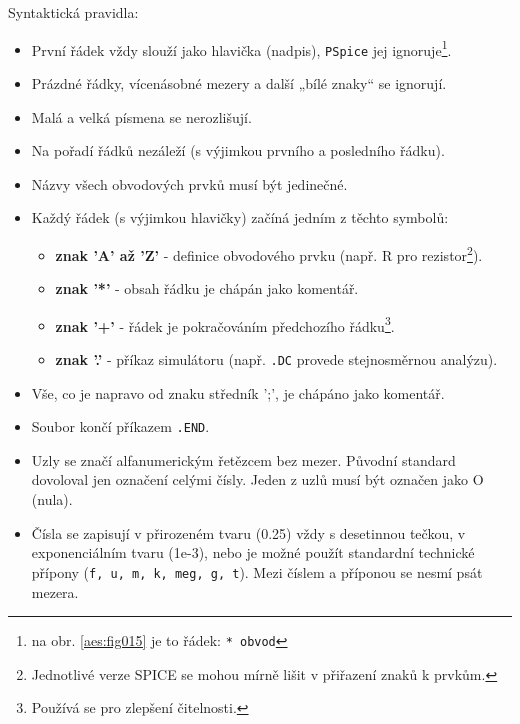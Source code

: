       \begin{tcnote}
        Syntaktická pravidla:
        \begin{itemize}[noitemsep]
          \item První řádek vždy slouží jako hlavička (nadpis), \texttt{PSpice} jej
                ignoruje\footnote{na obr. \ref{aes:fig015} je to řádek: \texttt{* obvod}}. 
          \item Prázdné řádky, vícenásobné mezery a další „bílé znaky“ se ignorují. 
          \item Malá a velká písmena se nerozlišují. 
          \item Na pořadí řádků nezáleží (s výjimkou prvního a posledního řádku). 
          \item Názvy všech obvodových prvků musí být jedinečné. 
          \item Každý řádek (s výjimkou hlavičky) začíná jedním z těchto symbolů: 
                \begin{itemize}[noitemsep]
                  \item \textbf{znak 'A' až 'Z'} - definice obvodového prvku (např. R pro
                        rezistor\footnote{Jednotlivé verze SPICE se mohou mírně lišit v přiřazení
                        znaků k prvkům.}).
                  \item \textbf{znak '*'} - obsah řádku je chápán jako komentář. 
                  \item \textbf{znak '+'} - řádek je pokračováním předchozího řádku\footnote{Používá
                        se pro zlepšení čitelnosti.}. 
                  \item \textbf{znak '.'} - příkaz simulátoru (např. \texttt{.DC} provede
                        stejnosměrnou analýzu).
                \end{itemize}
          \item Vše, co je napravo od znaku středník ';', je chápáno jako komentář.
          \item Soubor končí příkazem \texttt{.END}. 
          \item Uzly se značí alfanumerickým řetězcem bez mezer. Původní standard dovoloval jen
                označení celými čísly. Jeden z uzlů musí být označen jako O (nula).
          \item Čísla se zapisují v přirozeném tvaru (\num{0.25}) vždy s desetinnou tečkou, v
                exponenciálním tvaru (1e-3), nebo je možné použít standardní technické přípony
                (\texttt{f, u, m, k, meg, g, t}). Mezi číslem a příponou se nesmí psát mezera.

\end{itemize}
\end{tcnote}
